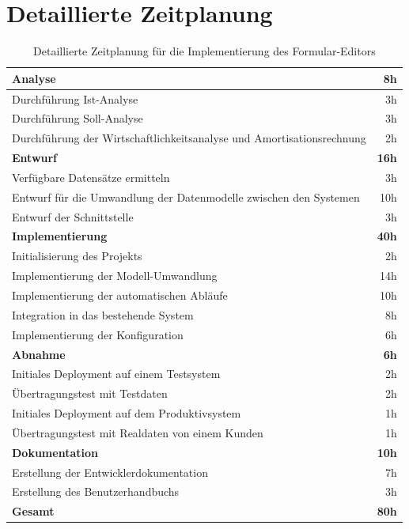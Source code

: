 \documentclass[a4paper,11pt]{article}
\begin{document}
\section{Detaillierte Zeitplanung}
\begin{table}[h]
\centering
\begin{tabular}{|l|r|}
\hline
\textbf{Analyse} & \textbf{8h} \\
\hline
Durchführung Ist-Analyse & 3h \\
\hline
Durchführung Soll-Analyse & 3h \\
\hline
Durchführung der Wirtschaftlichkeitsanalyse und Amortisationsrechnung & 2h \\
\hline
\textbf{Entwurf} & \textbf{16h} \\
\hline
Verfügbare Datensätze ermitteln & 3h \\
\hline
Entwurf für die Umwandlung der Datenmodelle zwischen den Systemen & 10h \\
\hline
Entwurf der Schnittstelle & 3h \\
\hline
\textbf{Implementierung} & \textbf{40h} \\
\hline
Initialisierung des Projekts & 2h \\
\hline
Implementierung der Modell-Umwandlung & 14h \\
\hline
Implementierung der automatischen Abläufe & 10h \\
\hline
Integration in das bestehende System & 8h \\
\hline
Implementierung der Konfiguration & 6h \\
\hline
\textbf{Abnahme} & \textbf{6h} \\
\hline
Initiales Deployment auf einem Testsystem & 2h \\
\hline
Übertragungstest mit Testdaten & 2h \\
\hline
Initiales Deployment auf dem Produktivsystem & 1h \\
\hline
Übertragungstest mit Realdaten von einem Kunden & 1h \\
\hline
\textbf{Dokumentation} & \textbf{10h} \\
\hline
Erstellung der Entwicklerdokumentation & 7h \\
\hline
Erstellung des Benutzerhandbuchs & 3h \\
\hline
\textbf{Gesamt} & \textbf{80h} \\
\hline
\end{tabular}
\caption{Detaillierte Zeitplanung für die Implementierung des Formular-Editors}
\end{table}
\end{document}
